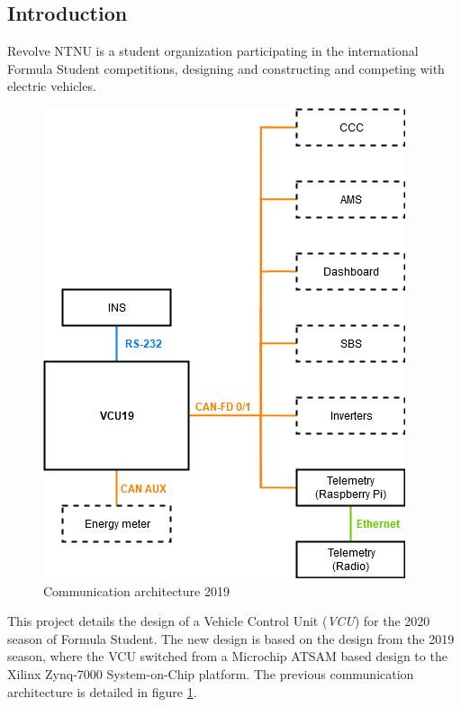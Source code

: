 \documentclass{article}
\begin{document}
\begin{multicols}{3}


\section*{Introduction}

Revolve NTNU is a student organization participating in the international Formula Student competitions, designing and constructing and competing with electric vehicles.


\begin{figure}[H]
    \centering
    \includegraphics[width=.45\linewidth]{media/vcu19_system_2.png}
    \caption{Communication architecture 2019}
    \label{fig:comarch_old}
\end{figure}

This project details the design of a Vehicle Control Unit (\emph{VCU}) for the 2020 season of Formula Student. The new design is based on the design from the 2019 season, where the VCU switched from a Microchip ATSAM based design to the Xilinx Zynq-7000 System-on-Chip platform. The previous communication architecture is detailed in figure \ref{fig:comarch_old}.



\end{multicols}
\end{document}
